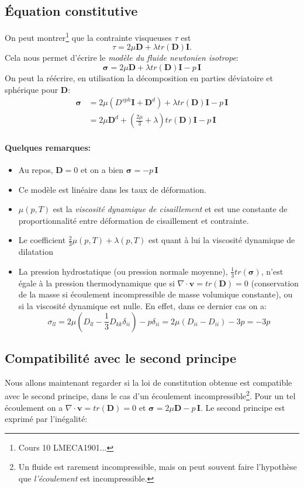 \subsection{\'Equation constitutive}
On peut montrer\footnote{Cours 10 LMECA1901...} que la contrainte visqueuses $\tau$ est
$$\tau=2\mu\textbf{D}+\lambda tr(\textbf{D})\textbf{I}.$$ Cela nous permet d'écrire le \emph{modèle du fluide newtonien isotrope}:
$$\boxed{\boldsymbol{\sigma}=2\mu\textbf{D}+\lambda tr(\textbf{D})\textbf{I}-p\,\textbf{I}}$$
On peut la réécrire, en utilisation la décomposition en parties déviatoire et sphérique pour \textbf{D}:
\begin{align*}
\boldsymbol{\sigma}&=2\mu(D^{sph}\textbf{I}+\textbf{D}^d)+\lambda tr(\textbf{D})\textbf{I}-p\,\textbf{I}\\
 &=2\mu\textbf{D}^d+\left(\frac{2\mu}{3}+\lambda\right)tr(\textbf{D})\textbf{I}-p\,\textbf{I}
\end{align*}
\paragraph{Quelques remarques:}
\begin{itemize}
\item Au repos, $\textbf{D}=0$ et on a bien $\boldsymbol{\sigma}=-p\,\textbf{I}$
\item Ce modèle est linéaire dans les taux de déformation.
\item $\mu(p,T)$ est la \emph{viscosité dynamique de cisaillement} et est une constante de proportionnalité entre  déformation de cisaillement et contrainte.
\item Le coefficient $\frac{2}{3}\mu(p,T)+\lambda(p,T)$ est quant à lui la viscosité dynamique de dilatation
\item La pression hydrostatique (ou pression normale moyenne), $\frac{1}{3}tr(\boldsymbol{\sigma})$, n'est égale à la pression thermodynamique que si $\nabla\cdot\textbf{v}=tr(\textbf{D})=0$ (conservation de la masse si écoulement incompressible de masse volumique constante), ou si la viscosité dynamique est nulle. En effet, dans ce dernier cas on a:
$$\sigma_{ll}=2\mu(D_{ll}-\frac{1}{3}D_{kk}\delta_{ii})-p\delta_{ii}=2\mu(D_{ii}-D_{ii})-3p=-3p$$
\end{itemize}

\subsection{Compatibilité avec le second principe}
Nous allons maintenant regarder si la loi de constitution obtenue est compatible avec le second principe, dans le cas d'un écoulement incompressible\footnote{Un fluide est rarement incompressible, mais on peut souvent faire l'hypothèse que \emph{l'écoulement} est incompressible.}. Pour un tel écoulement on a $\nabla\cdot\textbf{v}=tr(\textbf{D})=0$ et $\boldsymbol{\sigma}=2\mu\textbf{D}-p\,\textbf{I}$. Le second principe est exprimé par l'inégalité:

